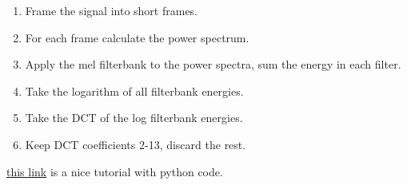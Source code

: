 \documentclass[]{article}
\begin{document}
\begin{enumerate}
\def\labelenumi{\arabic{enumi}.}
\itemsep1pt\parskip0pt
\item
  Frame the signal into short frames.
\item
  For each frame calculate the power spectrum.
\item
  Apply the mel filterbank to the power spectra, sum the energy in each
  filter.
\item
  Take the logarithm of all filterbank energies.
\item
  Take the DCT of the log filterbank energies.
\item
  Keep DCT coefficients 2-13, discard the rest.
\end{enumerate}

\href{http://www.practicalcryptography.com/miscellaneous/machine-learning/guide-mel-frequency-cepstral-coefficients-mfccs/}{this
link} is a nice tutorial with python code.




\end{document}
